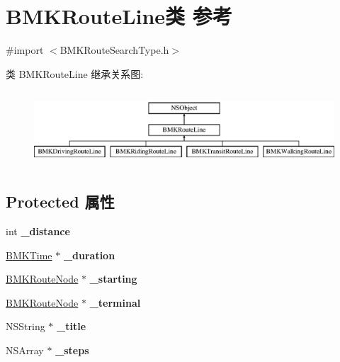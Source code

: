\hypertarget{interface_b_m_k_route_line}{}\section{B\+M\+K\+Route\+Line类 参考}
\label{interface_b_m_k_route_line}


{\ttfamily \#import $<$B\+M\+K\+Route\+Search\+Type.\+h$>$}

类 B\+M\+K\+Route\+Line 继承关系图\+:\begin{figure}[H]
\begin{center}
\leavevmode
\includegraphics[height=2.857143cm]{interface_b_m_k_route_line}
\end{center}
\end{figure}
\subsection*{Protected 属性}
\begin{DoxyCompactItemize}
\item 
\hypertarget{interface_b_m_k_route_line_ab4bc6b811527065bb19e0c8d1af822ee}{}int {\bfseries \+\_\+distance}\label{interface_b_m_k_route_line_ab4bc6b811527065bb19e0c8d1af822ee}

\item 
\hypertarget{interface_b_m_k_route_line_ab856ba5b78a2bb4d3625c0cf74b1e427}{}\hyperlink{interface_b_m_k_time}{B\+M\+K\+Time} $\ast$ {\bfseries \+\_\+duration}\label{interface_b_m_k_route_line_ab856ba5b78a2bb4d3625c0cf74b1e427}

\item 
\hypertarget{interface_b_m_k_route_line_adbeb7549910a94f1b6513b124808d57f}{}\hyperlink{interface_b_m_k_route_node}{B\+M\+K\+Route\+Node} $\ast$ {\bfseries \+\_\+starting}\label{interface_b_m_k_route_line_adbeb7549910a94f1b6513b124808d57f}

\item 
\hypertarget{interface_b_m_k_route_line_a42ee9b3affc42d0a25c52fa0dc2d4a8f}{}\hyperlink{interface_b_m_k_route_node}{B\+M\+K\+Route\+Node} $\ast$ {\bfseries \+\_\+terminal}\label{interface_b_m_k_route_line_a42ee9b3affc42d0a25c52fa0dc2d4a8f}

\item 
\hypertarget{interface_b_m_k_route_line_a862b967d37cfd210ba72dcaa6bad75b1}{}N\+S\+String $\ast$ {\bfseries \+\_\+title}\label{interface_b_m_k_route_line_a862b967d37cfd210ba72dcaa6bad75b1}

\item 
\hypertarget{interface_b_m_k_route_line_ad573249944bdb333411aa9ea588b3eb0}{}N\+S\+Array $\ast$ {\bfseries \+\_\+steps}\label{interface_b_m_k_route_line_ad573249944bdb333411aa9ea588b3eb0}

\end{DoxyCompactItemize}
